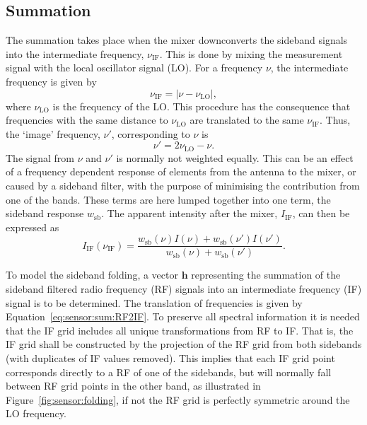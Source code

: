 \subsection{Summation}
\label{sec:sensor:sum}
The summation takes place when the mixer downconverts the sideband
signals into the intermediate frequency, $\nu_\mathrm{IF}$. This is
done by mixing the measurement signal with the local oscillator signal
(LO).  For a frequency $\nu$, the intermediate frequency is given by
\begin{equation}
  \label{eq:sensor:sum:v_if} 
  \nu_\mathrm{IF} = \vert \nu - \nu_\mathrm{LO} \vert,
\end{equation}
where $\nu_\mathrm{LO}$ is the frequency of the LO. This procedure has
the consequence that frequencies with the same distance to
$\nu_\mathrm{LO}$ are translated to the same $\nu_\mathrm{IF}$. Thus,
the `image' frequency, $\nu'$, corresponding to $\nu$ is
\begin{equation}
  \label{eq:sensor:sum:RF2IF}
  \nu' = 2\nu_\mathrm{LO} - \nu.
\end{equation}
The signal from $\nu$ and $\nu'$ is normally not weighted equally.
This can be an effect of a frequency dependent response of elements from
the antenna to the mixer, or caused by a sideband filter, with the
purpose of minimising the contribution from one of the bands. These
terms are here lumped together into one term, the sideband response
$w_\mathrm{sb}$. The apparent intensity after the mixer,
$I_\mathrm{IF}$, can then be expressed as
\begin{equation}
  \label{eq:sensor:sum:I_IF} 
  I_\mathrm{IF}(\nu_\mathrm{IF}) = \frac{w_\mathrm{sb}(\nu)I(\nu) + 
    w_\mathrm{sb}(\nu')I(\nu')}{w_\mathrm{sb}(\nu) + w_\mathrm{sb}(\nu')}.
\end{equation} 

To model the sideband folding, a vector $\mathbf{h}$ representing
the summation of the sideband filtered radio frequency (RF) signals
into an intermediate frequency (IF) signal is to be determined. The
translation of frequencies is given by Equation~\ref{eq:sensor:sum:RF2IF}. To
preserve all spectral information it is needed that the IF grid
includes all unique transformations from RF to IF. That is, the IF
grid shall be constructed by the projection of the RF grid from both
sidebands (with duplicates of IF values removed). This implies that
each IF grid point corresponds directly to a RF of one of the
sidebands, but will normally fall between RF grid points in the
other band, as illustrated in Figure~\ref{fig:sensor:folding}, 
if not the RF grid is perfectly symmetric around the LO frequency.

